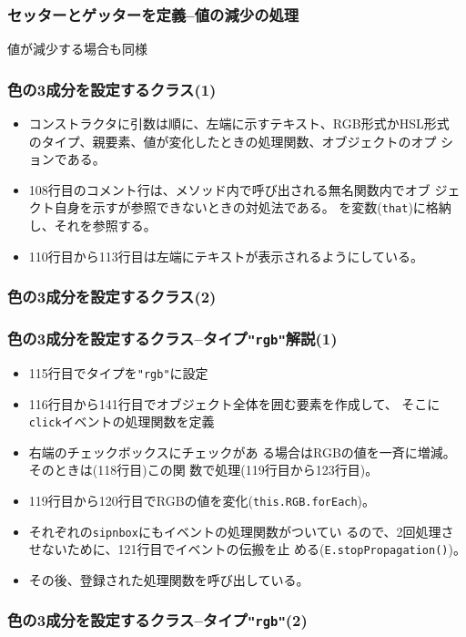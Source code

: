  \begin{frame}[containsverbatim]
  \frametitle{セッターとゲッターを定義--値の減少の処理}
  値が減少する場合も同様
 \end{frame}
 \begin{frame}[containsverbatim]
  \frametitle{色の3成分を設定するクラス(1)}
 \begin{itemize}
 \item コンストラクタに引数は順に、左端に示すテキスト、RGB形式かHSL形式
			 のタイプ、親要素、値が変化したときの処理関数、オブジェクトのオプ
			 ションである。
 \item 108行目のコメント行は、メソッド内で呼び出される無名関数内でオブ
			 ジェクト自身を示すが参照できないときの対処法である。
			 を変数(\texttt{that})に格納し、それを参照する。
 \item 110行目から113行目は左端にテキストが表示されるようにしている。
 \end{itemize}
 \end{frame}
 \begin{frame}[containsverbatim]
  \frametitle{色の3成分を設定するクラス(2)}
\end{frame}
 \begin{frame}[containsverbatim]
  \frametitle{色の3成分を設定するクラス--タイプ\texttt{"rgb"}解説(1)}
			 \begin{itemize}
				\item 115行目でタイプを\texttt{"rgb"}に設定
				\item 116行目から141行目でオブジェクト全体を囲む要素を作成して、
							そこに\texttt{click}イベントの処理関数を定義
				\item 右端のチェックボックスにチェックがあ
							る場合はRGBの値を一斉に増減。そのときは(118行目)この関
							数で処理(119行目から123行目)。
				\item 119行目から120行目でRGBの値を変化(\texttt{this.RGB.forEach})。
				\item それぞれの\texttt{sipnbox}にもイベントの処理関数がついてい
							るので、2回処理させないために、121行目でイベントの伝搬を止
							める(\texttt{E.stopPropagation()})。
				\item その後、登録された処理関数を呼び出している。
			 \end{itemize}
 \end{frame}
 \begin{frame}[containsverbatim]
  \frametitle{色の3成分を設定するクラス--タイプ\texttt{"rgb"}(2)}
\end{frame}
